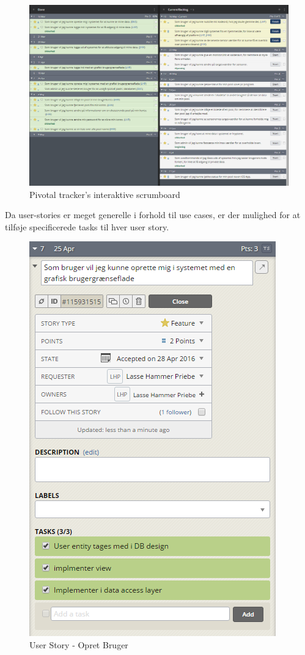 \begin{figure}
	\centering
	\includegraphics[width=\linewidth]{figs/processProjektGennemforsel/scrumboard.PNG}
	\caption{Pivotal tracker's interaktive scrumboard}
	\label{fig:scrumboard}
\end{figure}

 Da user-stories er meget generelle i forhold til use cases, er der mulighed for at tilføje specificerede tasks til hver user story.

\begin{figure}
\centering
\includegraphics[width=0.5\linewidth]{figs/processProjektGennemforsel/userstory_with_tasks.PNG}
\caption{User Story - Opret Bruger}
\label{fig:userstory_with_tasks}
\end{figure}

